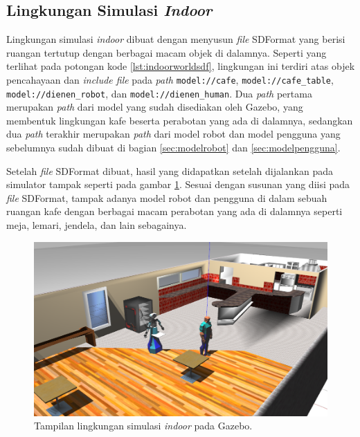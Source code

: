 \subsection{Lingkungan Simulasi \emph{Indoor}}
\label{subsec:lingkunganindoor}

Lingkungan simulasi \emph{indoor} dibuat dengan menyusun \emph{file} SDFormat yang berisi ruangan tertutup dengan berbagai macam objek di dalamnya.
Seperti yang terlihat pada potongan kode \ref{lst:indoorworldsdf},
  lingkungan ini terdiri atas objek pencahayaan dan \emph{include file} pada \emph{path} \lstinline{model://cafe}, \lstinline{model://cafe_table}, \lstinline{model://dienen_robot}, dan \lstinline{model://dienen_human}.
Dua \emph{path} pertama merupakan \emph{path} dari model yang sudah disediakan oleh Gazebo,
  yang membentuk lingkungan kafe beserta perabotan yang ada di dalamnya,
  sedangkan dua \emph{path} terakhir merupakan \emph{path} dari model robot dan model pengguna yang sebelumnya sudah dibuat di bagian \ref{sec:modelrobot} dan \ref{sec:modelpengguna}.



Setelah \emph{file} SDFormat dibuat,
  hasil yang didapatkan setelah dijalankan pada simulator tampak seperti pada gambar \ref{fig:lingkunganindoor}.
Sesuai dengan susunan yang diisi pada \emph{file} SDFormat,
  tampak adanya model robot dan pengguna di dalam sebuah ruangan kafe dengan berbagai macam perabotan yang ada di dalamnya seperti meja, lemari, jendela, dan lain sebagainya.

\begin{figure}[ht]
  \centering
  \includegraphics[scale=0.23]{gambar/lingkungan-indoor.png}
  \caption{Tampilan lingkungan simulasi \emph{indoor} pada Gazebo.}
  \label{fig:lingkunganindoor}
\end{figure}
